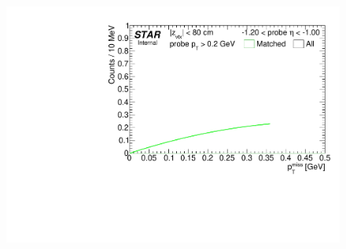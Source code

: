 \begin{figure}[ht]
{  \includegraphics[width=\linewidth,page=11]{graphics/systematicsEfficiency/TOF_tagAndProbe/Fitting_effVsEta_mc.pdf}
}%
\end{figure}

